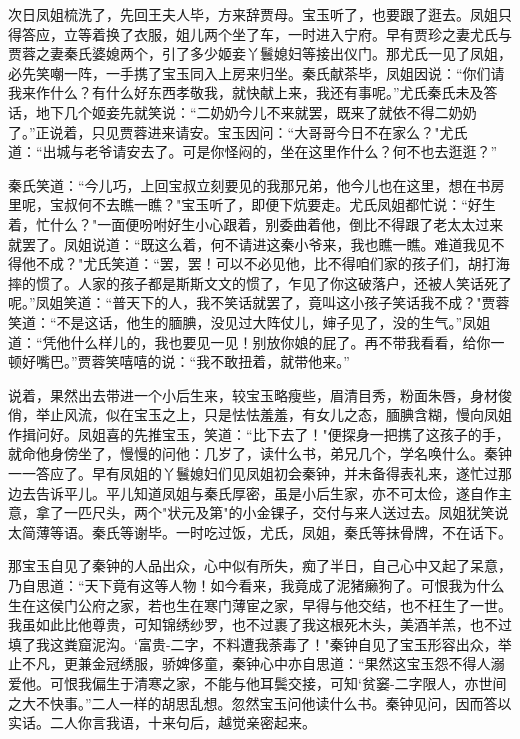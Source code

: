 次日凤姐梳洗了，先回王夫人毕，方来辞贾母。宝玉听了，也要跟了逛去。凤姐只得答应，立等着换了衣服，姐儿两个坐了车，一时进入宁府。早有贾珍之妻尤氏与贾蓉之妻秦氏婆媳两个，引了多少姬妾丫鬟媳妇等接出仪门。那尤氏一见了凤姐，必先笑嘲一阵，一手携了宝玉同入上房来归坐。秦氏献茶毕，凤姐因说：“你们请我来作什么？有什么好东西孝敬我，就快献上来，我还有事呢。”尤氏秦氏未及答话，地下几个姬妾先就笑说：“二奶奶今儿不来就罢，既来了就依不得二奶奶了。”正说着，只见贾蓉进来请安。宝玉因问：“大哥哥今日不在家么？"尤氏道：“出城与老爷请安去了。可是你怪闷的，坐在这里作什么？何不也去逛逛？”

秦氏笑道：“今儿巧，上回宝叔立刻要见的我那兄弟，他今儿也在这里，想在书房里呢，宝叔何不去瞧一瞧？"宝玉听了，即便下炕要走。尤氏凤姐都忙说：“好生着，忙什么？"一面便吩咐好生小心跟着，别委曲着他，倒比不得跟了老太太过来就罢了。凤姐说道：“既这么着，何不请进这秦小爷来，我也瞧一瞧。难道我见不得他不成？"尤氏笑道：“罢，罢！可以不必见他，比不得咱们家的孩子们，胡打海摔的惯了。人家的孩子都是斯斯文文的惯了，乍见了你这破落户，还被人笑话死了呢。”凤姐笑道：“普天下的人，我不笑话就罢了，竟叫这小孩子笑话我不成？"贾蓉笑道：“不是这话，他生的腼腆，没见过大阵仗儿，婶子见了，没的生气。”凤姐道：“凭他什么样儿的，我也要见一见！别放你娘的屁了。再不带我看看，给你一顿好嘴巴。”贾蓉笑嘻嘻的说：“我不敢扭着，就带他来。”

说着，果然出去带进一个小后生来，较宝玉略瘦些，眉清目秀，粉面朱唇，身材俊俏，举止风流，似在宝玉之上，只是怯怯羞羞，有女儿之态，腼腆含糊，慢向凤姐作揖问好。凤姐喜的先推宝玉，笑道：“比下去了！"便探身一把携了这孩子的手，就命他身傍坐了，慢慢的问他：几岁了，读什么书，弟兄几个，学名唤什么。秦钟一一答应了。早有凤姐的丫鬟媳妇们见凤姐初会秦钟，并未备得表礼来，遂忙过那边去告诉平儿。平儿知道凤姐与秦氏厚密，虽是小后生家，亦不可太俭，遂自作主意，拿了一匹尺头，两个"状元及第"的小金锞子，交付与来人送过去。凤姐犹笑说太简薄等语。秦氏等谢毕。一时吃过饭，尤氏，凤姐，秦氏等抹骨牌，不在话下。

那宝玉自见了秦钟的人品出众，心中似有所失，痴了半日，自己心中又起了呆意，乃自思道：“天下竟有这等人物！如今看来，我竟成了泥猪癞狗了。可恨我为什么生在这侯门公府之家，若也生在寒门薄宦之家，早得与他交结，也不枉生了一世。我虽如此比他尊贵，可知锦绣纱罗，也不过裹了我这根死木头，美酒羊羔，也不过填了我这粪窟泥沟。`富贵-二字，不料遭我荼毒了！"秦钟自见了宝玉形容出众，举止不凡，更兼金冠绣服，骄婢侈童，秦钟心中亦自思道：“果然这宝玉怨不得人溺爱他。可恨我偏生于清寒之家，不能与他耳鬓交接，可知`贫窭-二字限人，亦世间之大不快事。”二人一样的胡思乱想。忽然宝玉问他读什么书。秦钟见问，因而答以实话。二人你言我语，十来句后，越觉亲密起来。

